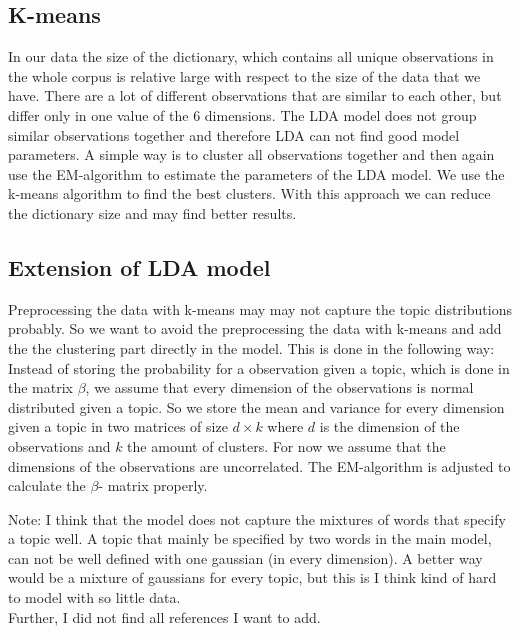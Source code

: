 \documentclass[11pt,a4paper]{article}
\begin{document}
\subsection{K-means}
In our data the size of the dictionary, which contains all unique observations in the whole corpus is relative large with respect to the size of the data that we have. There are a lot of different observations that are similar to each other, but differ only in one value of the 6 dimensions. The LDA model does not group similar observations together and therefore LDA can not find good model parameters.
A simple way is to cluster all observations together and then again use the EM-algorithm to estimate the parameters of the  LDA model. We use the k-means algorithm to find the best clusters. With this approach we can reduce the dictionary size and may find better results.


\subsection{Extension of LDA model}
Preprocessing the data with k-means may may not capture the topic distributions probably. So we want to avoid the preprocessing the data with k-means and add the the clustering part directly in the model. This is done in the following way:
Instead of storing the probability for a observation given a topic, which is done in the matrix $\beta$, we assume that every dimension of the observations is normal distributed given a topic. So we store the mean and variance for every dimension given a topic in two matrices of size $d \times k$ where $d$ is the dimension of the observations and $k$ the amount of clusters. For now we assume that the dimensions of the observations are uncorrelated. The EM-algorithm is adjusted to calculate the $\beta$- matrix properly.

Note:
I think that the model does not capture the mixtures of words that specify a topic well. A topic that mainly be specified by two words in the main model, can not be well defined with one gaussian (in every dimension). A better way would be a mixture of gaussians for every topic, but this is I think kind of hard to model with so little data.\\
Further, I did not find all references I want to add.





\end{document}
